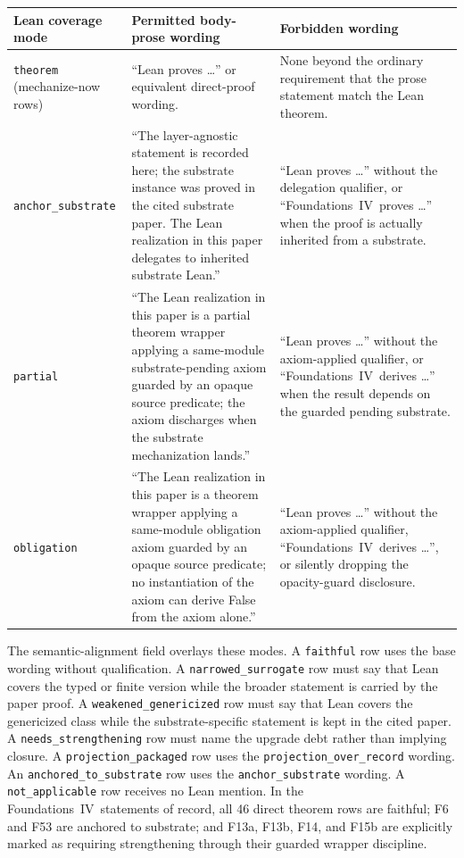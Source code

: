 \documentclass[11pt]{article}
\newcommand{\FIV}{Foundations~IV}
\theoremstyle{definition}
\begin{document}
\begin{center}
\small
\begin{tabularx}{\textwidth}{@{}
    >{\raggedright\arraybackslash}p{}
    >{\raggedright\arraybackslash}X
    >{\raggedright\arraybackslash}X@{}}
  \toprule
  Lean coverage mode & Permitted body-prose wording & Forbidden wording \\
  \midrule
  \texttt{theorem} (mechanize-now rows) &
  ``Lean proves \ldots'' or equivalent direct-proof wording. &
  None beyond the ordinary requirement that the prose statement match
  the Lean theorem. \\
  \texttt{anchor\_substrate} &
  ``The layer-agnostic statement is recorded here; the substrate
  instance was proved in the cited substrate paper. The Lean realization
  in this paper delegates to inherited substrate Lean.'' &
  ``Lean proves \ldots'' without the delegation qualifier, or
  ``\FIV\ proves \ldots'' when the proof is actually inherited from a
  substrate. \\
  \texttt{partial} &
  ``The Lean realization in this paper is a partial theorem wrapper
  applying a same-module substrate-pending axiom guarded by an opaque
  source predicate; the axiom discharges when the substrate
  mechanization lands.'' &
  ``Lean proves \ldots'' without the axiom-applied qualifier, or
  ``\FIV\ derives \ldots'' when the result depends on the guarded
  pending substrate. \\
  \texttt{obligation} &
  ``The Lean realization in this paper is a theorem wrapper applying a
  same-module obligation axiom guarded by an opaque source predicate; no
  instantiation of the axiom can derive False from the axiom alone.'' &
  ``Lean proves \ldots'' without the axiom-applied qualifier, ``\FIV\
  derives \ldots'', or silently dropping the opacity-guard disclosure. \\
  \bottomrule
\end{tabularx}
\end{center}

The semantic-alignment field overlays these modes. A \texttt{faithful}
row uses the base wording without qualification. A
\texttt{narrowed\_surrogate} row must say that Lean covers the
typed or finite version while the broader statement is carried by the
paper proof. A \texttt{weakened\_genericized} row must say that Lean
covers the genericized class while the substrate-specific statement is
kept in the cited paper. A \texttt{needs\_strengthening} row must name
the upgrade debt rather than implying closure. A
\texttt{projection\_packaged} row uses the
\texttt{projection\_over\_record} wording. An
\texttt{anchored\_to\_substrate} row uses the
\texttt{anchor\_substrate} wording. A \texttt{not\_applicable} row
receives no Lean mention. In the \FIV\ statements of record, all 46
direct theorem rows are faithful; F6 and F53 are anchored to substrate;
and F13a, F13b, F14, and F15b are explicitly marked as requiring
strengthening through their guarded wrapper discipline.
\end{document}

